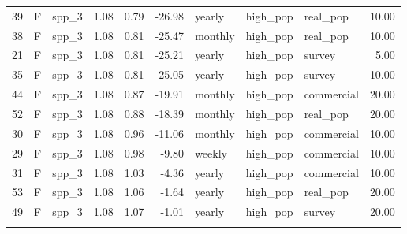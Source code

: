 \begin{longtable}{rllrrrlllr}
   39 & F & spp\_3 & 1.08 & 0.79 & -26.98 & yearly & high\_pop & real\_pop & 10.00 \\ 
   38 & F & spp\_3 & 1.08 & 0.81 & -25.47 & monthly & high\_pop & real\_pop & 10.00 \\ 
   21 & F & spp\_3 & 1.08 & 0.81 & -25.21 & yearly & high\_pop & survey & 5.00 \\ 
   35 & F & spp\_3 & 1.08 & 0.81 & -25.05 & yearly & high\_pop & survey & 10.00 \\ 
   44 & F & spp\_3 & 1.08 & 0.87 & -19.91 & monthly & high\_pop & commercial & 20.00 \\ 
   52 & F & spp\_3 & 1.08 & 0.88 & -18.39 & monthly & high\_pop & real\_pop & 20.00 \\ 
   30 & F & spp\_3 & 1.08 & 0.96 & -11.06 & monthly & high\_pop & commercial & 10.00 \\ 
   29 & F & spp\_3 & 1.08 & 0.98 & -9.80 & weekly & high\_pop & commercial & 10.00 \\ 
   31 & F & spp\_3 & 1.08 & 1.03 & -4.36 & yearly & high\_pop & commercial & 10.00 \\ 
   53 & F & spp\_3 & 1.08 & 1.06 & -1.64 & yearly & high\_pop & real\_pop & 20.00 \\ 
   49 & F & spp\_3 & 1.08 & 1.07 & -1.01 & yearly & high\_pop & survey & 20.00 \\ 
   \hline
\hline
\label{tab:6}
\end{longtable}
